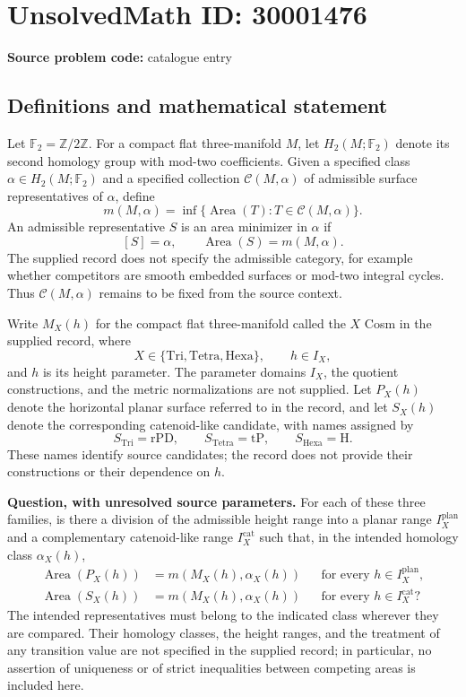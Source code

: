 \documentclass[11pt]{article}
\newcommand{\Z}{\mathbb{Z}}
\newcommand{\F}{\mathbb{F}}
\begin{document}
\section*{UnsolvedMath ID: 30001476}
\textbf{Source problem code:} catalogue entry
\subsection{Definitions and mathematical statement}
Let \(\F_2=\Z/2\Z\). For a compact flat three-manifold \(M\), let \(H_2(M;\F_2)\) denote its second homology group with mod-two coefficients. Given a specified class \(\alpha\in H_2(M;\F_2)\) and a specified collection \(\mathcal C(M,\alpha)\) of admissible surface representatives of \(\alpha\), define
\[
 m(M,\alpha)=\inf\{\operatorname{Area}(T):T\in\mathcal C(M,\alpha)\}.
\]
An admissible representative \(S\) is an area minimizer in \(\alpha\) if
\[
 [S]=\alpha,\qquad \operatorname{Area}(S)=m(M,\alpha).
\]
The supplied record does not specify the admissible category, for example whether competitors are smooth embedded surfaces or mod-two integral cycles. Thus \(\mathcal C(M,\alpha)\) remains to be fixed from the source context.

Write \(M_X(h)\) for the compact flat three-manifold called the \(X\) Cosm in the supplied record, where
\[
 X\in\{\mathrm{Tri},\mathrm{Tetra},\mathrm{Hexa}\},\qquad h\in I_X,
\]
and \(h\) is its height parameter. The parameter domains \(I_X\), the quotient constructions, and the metric normalizations are not supplied. Let \(P_X(h)\) denote the horizontal planar surface referred to in the record, and let \(S_X(h)\) denote the corresponding catenoid-like candidate, with names assigned by
\[
 S_{\mathrm{Tri}}=\mathrm{rPD},\qquad
 S_{\mathrm{Tetra}}=\mathrm{tP},\qquad
 S_{\mathrm{Hexa}}=\mathrm{H}.
\]
These names identify source candidates; the record does not provide their constructions or their dependence on \(h\).

\textbf{Question, with unresolved source parameters.} For each of these three families, is there a division of the admissible height range into a planar range \(I_X^{\mathrm{plan}}\) and a complementary catenoid-like range \(I_X^{\mathrm{cat}}\) such that, in the intended homology class \(\alpha_X(h)\),
\[
 \begin{aligned}
 \operatorname{Area}(P_X(h))&=m(M_X(h),\alpha_X(h))
 &&\text{for every }h\in I_X^{\mathrm{plan}},\\
 \operatorname{Area}(S_X(h))&=m(M_X(h),\alpha_X(h))
 &&\text{for every }h\in I_X^{\mathrm{cat}}?
 \end{aligned}
\]
The intended representatives must belong to the indicated class wherever they are compared. Their homology classes, the height ranges, and the treatment of any transition value are not specified in the supplied record; in particular, no assertion of uniqueness or of strict inequalities between competing areas is included here.
\end{document}
